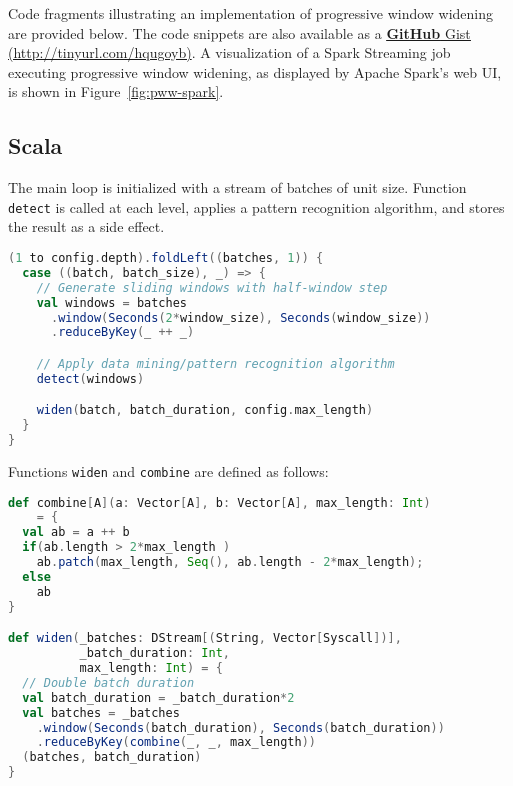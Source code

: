 \documentclass[runningheads,a4paper]{llncs}
\begin{document}
Code fragments illustrating an implementation of progressive window
widening are provided below. The code snippets
are also available as a
\href{https://gist.github.com/dtolpin/84158adce3e4218af06453771cae15f2}{\underline{\textbf{GitHub} Gist}}
\href{https://gist.github.com/dtolpin/84158adce3e4218af06453771cae15f2}{(http://tinyurl.com/hqugoyb)}.
A visualization of a Spark Streaming job executing progressive
window widening, as displayed by Apache Spark's web UI, is shown in
Figure~\ref{fig:pww-spark}.

\clearpage
\subsection*{Scala}


The main loop is initialized with a stream  of batches of unit size.  Function
\texttt{detect} is called at each level, applies a pattern recognition
algorithm, and stores the result as a side effect.

\begin{lstlisting}[language=scala, style=scalastyle]
(1 to config.depth).foldLeft((batches, 1)) {
  case ((batch, batch_size), _) => {
    // Generate sliding windows with half-window step
    val windows = batches
      .window(Seconds(2*window_size), Seconds(window_size))
      .reduceByKey(_ ++ _)

    // Apply data mining/pattern recognition algorithm
    detect(windows)

    widen(batch, batch_duration, config.max_length)
  }
}
\end{lstlisting}

Functions \texttt{widen} and \texttt{combine} are defined as follows:

\begin{lstlisting}[language=scala, style=scalastyle]
def combine[A](a: Vector[A], b: Vector[A], max_length: Int)
    = {
  val ab = a ++ b
  if(ab.length > 2*max_length )
    ab.patch(max_length, Seq(), ab.length - 2*max_length);
  else
    ab
}

def widen(_batches: DStream[(String, Vector[Syscall])],
          _batch_duration: Int,
          max_length: Int) = {
  // Double batch duration
  val batch_duration = _batch_duration*2
  val batches = _batches
    .window(Seconds(batch_duration), Seconds(batch_duration))
    .reduceByKey(combine(_, _, max_length))
  (batches, batch_duration)
}
\end{lstlisting}
\end{document}
